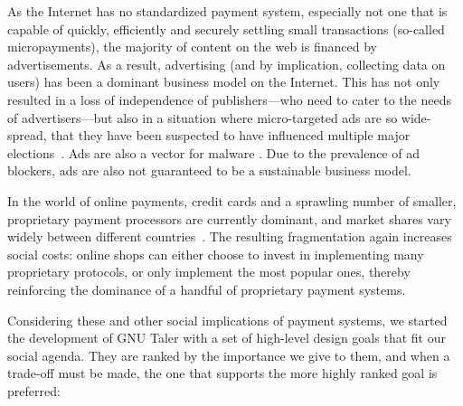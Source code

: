 As the Internet has no standardized payment system, especially not one
that is capable of quickly, efficiently and securely settling small
transactions (so-called micropayments), the majority of content on the web is
financed by advertisements.  As a result, advertising (and by
implication, collecting data on users) has been a dominant business
model on the Internet.  This has not only resulted in a loss of
independence of publishers---who need to cater to the needs
of advertisers---but also in a situation where micro-targeted ads
are so wide-spread, that they have been suspected to have influenced
multiple major elections~\cite{persily2017election}.  Ads are also a
vector for malware \cite{provos2007ghost}.  Due to the prevalence of
ad blockers, ads are also not guaranteed to be a sustainable business
model.

In the world of online payments, credit cards and a sprawling number
of smaller, proprietary payment processors are currently dominant, and
market shares vary widely between different
countries~\cite{adyen2016global,paypers2016ecommerce}.  The resulting
fragmentation again increases social costs: online shops can either
choose to invest in implementing many proprietary protocols, or only
implement the most popular ones, thereby reinforcing the dominance of
a handful of proprietary payment systems.

Considering these and other social implications of payment systems, we
started the development of GNU Taler with a set of high-level design
goals that fit our social agenda.  They are ranked by the importance
we give to them, and when a trade-off must be made, the one that
supports the more highly ranked goal is preferred:

